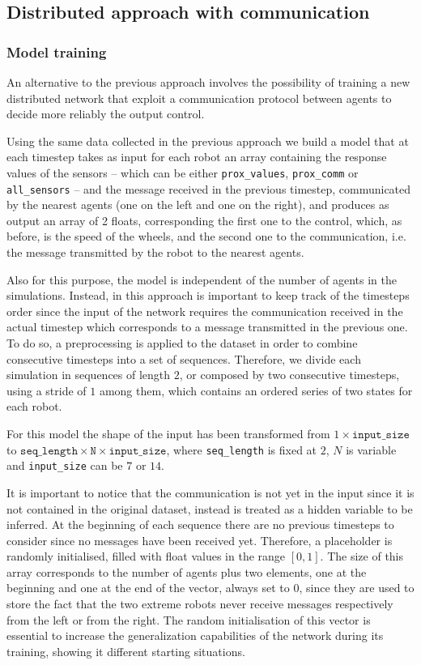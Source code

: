 \subsection{Distributed approach with communication}
\label{subsec:ex1comm}

\subsubsection{Model training}
\label{subsubsec:learnedcomm}
An alternative to the previous approach involves the possibility of training a 
new distributed network that exploit a communication protocol between 
agents to decide more reliably the output control.

Using the same data collected in the previous approach we build a model that 
at each timestep takes as input for each robot an array containing the 
response values of the sensors – which can be either \texttt{prox\_values}, 
\texttt{prox\_comm} or \texttt{all\_sensors} – and the message received in 
the previous timestep, communicated by the nearest agents (one on the left 
and one on the right), and produces as output an array of 2 floats, 
corresponding the first one to the control, which, as before, is the speed of 
the wheels, and the second one to the communication, i.e. the message 
transmitted by the robot to the nearest agents.

Also for this purpose, the model is independent of the number of agents in 
the simulations. Instead, in this approach is important to keep track of the 
timesteps order since the input of the network requires the communication 
received in the actual timestep which corresponds to a message transmitted 
in the previous one. 
To do so, a preprocessing is applied to the dataset in order to combine 
consecutive timesteps into a set of sequences. Therefore, we divide each 
simulation in sequences of length $2$, or composed by two consecutive 
timesteps, using a stride of $1$ among them, which contains an ordered 
series of two states for each robot.   

For this model the shape of the input has been transformed from $1 \times 
\mathtt{input\_size}$ to $\mathtt{seq\_length} \times \mathtt{N} \times 
\mathtt{input\_size}$, where \texttt{seq\_length} is fixed at $2$, $N$ is variable 
and \texttt{input\_size} can be $7$ or $14$.

It is important to notice that the communication is not yet in the input since 
it is not contained in the original dataset, instead is treated as a hidden 
variable to be inferred. 
At the beginning of each sequence there are no previous timesteps to 
consider since no messages have been received yet. Therefore, a placeholder 
is randomly initialised, filled with float values in the range $[0, 1]$. 
The size of this array corresponds to the number of agents plus two 
elements, one at the beginning and one at the end of the vector, always set 
to $0$, since they are used to store the fact that the two extreme robots 
never receive messages respectively from the left or from the right. 
The random initialisation of this vector is essential to increase the 
generalization capabilities of the network during its training, showing it 
different starting situations.

